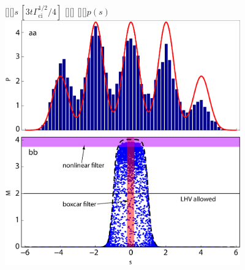 

 \figstyle
  [][]{$s\,[3t\Gamma_\text{ci}^{1/2}/4]$}
  [][]{\MM}
  [][]{$p(s)$}
  \dopanelsatod
 \includegraphics[width=4in]{ghz2.eps}

